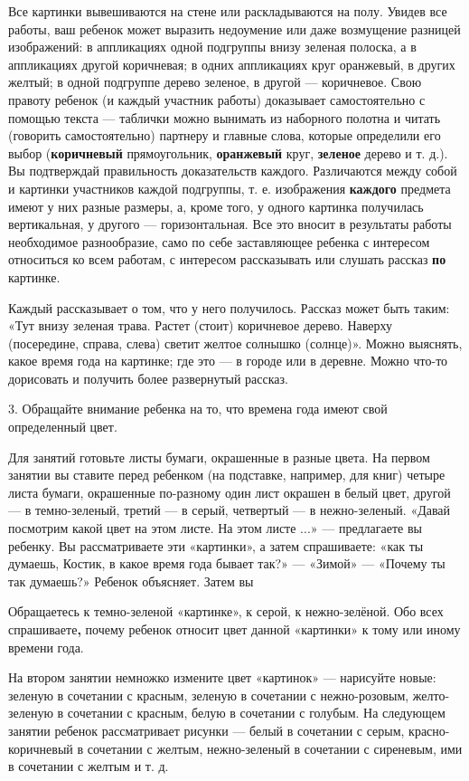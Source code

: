 \documentclass[a5paper]{book}
\begin{document}
Все картинки вывешиваются на стене или раскладываются на полу. Увидев
все работы, ваш ребенок может выразить недоумение или даже возмущение
разницей изображений: в аппликациях одной подгруппы внизу зеленая
полоска, а в аппликациях другой коричневая; в одних аппликациях круг
оранжевый, в других желтый; в одной подгруппе дерево зеленое, в другой
--- коричневое. Свою правоту ребенок (и каждый участник работы)
доказывает самостоятельно с помощью текста --- таблички можно вынимать
из наборного полотна и читать (говорить самостоятельно) партнеру и
главные слова, которые определили его выбор (\textbf{коричневый}
прямоугольник, \textbf{оранжевый} круг, \textbf{зеленое} дерево и т.
д.). Вы подтверждай правильность доказательств каждого. Различаются
между собой и картинки участников каждой подгруппы, т. е. изображения
\textbf{каждого} предмета имеют у них разные размеры, а, кроме того, у
одного картинка получилась вертикальная, у другого --- горизонтальная.
Все это вносит в результаты работы необходимое разнообразие, само по
себе заставляющее ребенка с интересом относиться ко всем работам, с
интересом рассказывать или слушать рассказ \textbf{по} картинке.

Каждый рассказывает о том, что у него получилось. Рассказ может быть
таким: «Тут внизу зеленая трава. Растет (стоит) коричневое дерево.
Наверху (посередине, справа, слева) светит желтое солнышко (солнце)».
Можно выяснять, какое время года на картинке; где это --- в городе или в
деревне. Можно что-то дорисовать и получить более развернутый рассказ.

3. Обращайте внимание ребенка на то, что времена года имеют свой
определенный цвет.

Для занятий готовьте листы бумаги, окрашенные в разные цвета. На первом
занятии вы ставите перед ребенком (на подставке, например, для книг)
четыре листа бумаги, окрашенные по-разному один лист окрашен в белый
цвет, другой --- в темно-зеленый, третий --- в серый, четвертый --- в
нежно-зеленый. «Давай посмотрим какой цвет на этом листе. На этом листе
...» --- предлагаете вы ребенку. Вы рассматриваете эти «картинки», а
затем спрашиваете: «как ты думаешь, Костик, в какое время года бывает
так?» --- «Зимой» --- «Почему ты так думаешь?» Ребенок объясняет. Затем
вы

Обращаетесь к темно-зеленой «картинке», к серой, к нежно-зелёной. Обо
всех спрашиваете\textbf{,} почему ребенок относит цвет данной «картинки»
к тому или иному времени года.

На втором занятии немножко измените цвет «картинок» --- нарисуйте новые:
зеленую в сочетании с красным, зеленую в сочетании с нежно-розовым,
желто-зеленую в сочетании с красным, белую в сочетании с голубым. На
следующем занятии ребенок рассматривает рисунки --- белый в сочетании с
серым, красно-коричневый в сочетании с желтым, нежно-зеленый в сочетании
с сиреневым, ими в сочетании с желтым и т. д.
\end{document}
